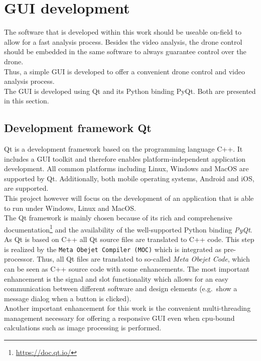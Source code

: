 \section{\acs*{GUI} development}
The software that is developed within this work should be useable on-field to
allow for a fast analysis process.
Besides the video analysis, the drone control should be embedded in the same 
software to always guarantee control over the drone.\\
Thus, a simple \ac{GUI} is developed to offer a convenient drone control and 
video analysis process.\\
The \ac{GUI} is developed using Qt and its Python binding PyQt.
Both are presented in this section. 

\subsection{Development framework Qt}\label{subsec:2_qt}
Qt is a development framework based on the programming language C++.
It includes a \ac{GUI} toolkit and therefore enables platform-independent
application development.
All common platforms including Linux, Windows and MacOS are supported by 
Qt.
Additionally, both mobile operating systems, Android and iOS, are supported.\\
This project however will focus on the development of an application that is 
able to run under Windows, Linux and MacOS.\\
The Qt framework is mainly chosen because of its rich and comprehensive 
documentation\footnote{\url{https://doc.qt.io/}} and the availability of the 
well-supported Python binding \textit{PyQt}.\\
As Qt is based on C++ all Qt source files are translated to C++ code.
This step is realized by the \texttt{Meta Obejet Compiler (MOC)} which is 
integrated as pre-processor.
Thus, all Qt files are translated to so-called \textit{Meta Obejet Code}, 
which can be seen as C++ source code with some enhancements.
The most important enhancement is the signal and slot functionality which 
allows for an easy communication between different software and design 
elements (e.g.\ show a message dialog when a button is clicked).\\
Another important enhancement for this work is the convenient multi-threading
management necessary for offering a responsive \ac{GUI} even when cpu-bound 
calculations such as image processing is performed.

